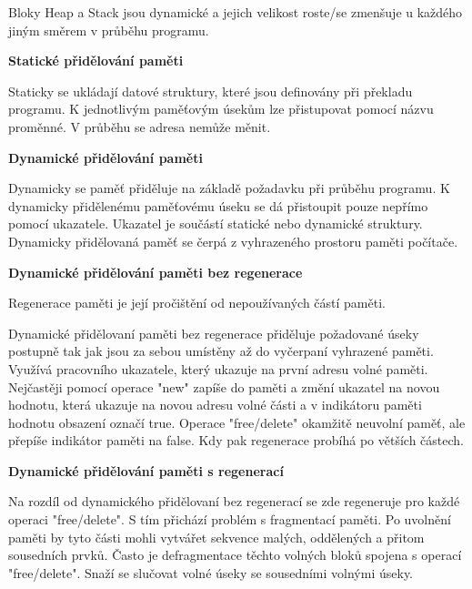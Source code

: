  Bloky Heap a Stack jsou dynamické a jejich velikost roste/se zmenšuje u každého jiným směrem v průběhu programu.

\begin{Large}\vspace{0,5cm} \textbf{Statické přidělování paměti}
\end{Large}

 Staticky se ukládají datové struktury, které jsou definovány při překladu programu. K jednotlivým paměťovým úsekům lze přistupovat pomocí názvu proměnné. V průběhu se adresa nemůže měnit.

\begin{Large}\vspace{0,5cm} \textbf{Dynamické přidělování paměti}
\end{Large}

 Dynamicky se paměť přiděluje na základě požadavku při průběhu programu. K dynamicky přidělenému paměťovému úseku se dá přistoupit pouze nepřímo pomocí ukazatele. Ukazatel je součástí statické nebo dynamické struktury. Dynamicky přidělovaná paměť se čerpá z vyhrazeného prostoru paměti počítače.

\begin{Large}\vspace{0,5cm} \textbf{Dynamické přidělování paměti bez regenerace}
\end{Large}

 Regenerace paměti je její pročištění od nepoužívaných částí paměti.

 Dynamické přidělovaní paměti bez regenerace přiděluje požadované úseky postupně tak jak jsou za sebou umístěny až do vyčerpaní vyhrazené paměti. Využívá pracovního ukazatele, který ukazuje na první adresu volné paměti. Nejčastěji pomocí operace "new" zapíše do paměti a změní ukazatel na novou hodnotu, která ukazuje na novou adresu volné části a v indikátoru paměti hodnotu obsazení označí true. Operace "free/delete" okamžitě neuvolní paměť, ale přepíše indikátor paměti na false. Kdy pak regenerace probíhá po větších částech. 

\begin{Large}\vspace{0,5cm} \textbf{Dynamické přidělování paměti s regenerací}
\end{Large}

 Na rozdíl od dynamického přidělovaní bez regenerací se zde regeneruje pro každé operaci "free/delete". S tím přichází problém s fragmentací paměti. Po uvolnění paměti by tyto části mohli vytvářet sekvence malých, oddělených a přitom sousedních prvků. Často je defragmentace těchto volných bloků spojena s operací "free/delete". Snaží se slučovat volné úseky se sousedními volnými úseky.

